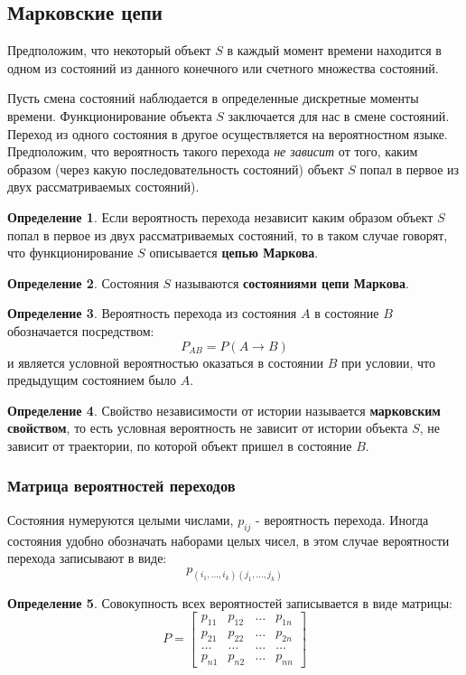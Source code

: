 \documentclass[aps,%
12pt,%
final,%
oneside,
onecolumn,%
musixtex, %
superscriptaddress,%
centertags]{article} %
\theoremstyle{plain}
\theoremstyle{definition}
\newtheorem{definition}{Определение}[subsection]
\theoremstyle{remark}
\begin{document}
\newpage
\subsection{Марковские цепи}

Предположим, что некоторый объект $S$ в каждый момент времени находится в одном из состояний из данного конечного или счетного множества состояний.

Пусть смена состояний наблюдается в определенные дискретные моменты времени. Функционирование объекта $S$ заключается для нас в смене состояний. Переход из одного состояния в другое осуществляется на вероятностном языке. Предположим, что вероятность такого перехода \textit{не зависит} от того, каким образом (через какую последовательность состояний) объект $S$ попал в первое из двух рассматриваемых состояний).

\begin{definition}
	Если вероятность перехода независит каким образом объект $S$ попал в первое из двух рассматриваемых состояний, то в таком случае говорят, что функционирование $S$ описывается \textbf{цепью Маркова}. 
\end{definition}
\begin{definition}
	Состояния $S$ называются \textbf{состояниями цепи Маркова}.
\end{definition}
\begin{definition}
	Вероятность перехода из состояния $A$ в состояние $B$ обозначается посредством:
	$$P_{AB} = P(A \to B)$$
	и является условной вероятностью оказаться в состоянии $B$ при условии, что предыдущим состоянием было $A$.
\end{definition}
\begin{definition}
	Свойство независимости от истории называется \textbf{марковским свойством}, то есть условная вероятность не зависит от истории объекта $S$, не зависит от траектории, по которой объект пришел в состояние $B$.
\end{definition}

\subsubsection{Матрица вероятностей переходов}

Состояния нумеруются целыми числами, $p_{ij}$ - вероятность перехода.  Иногда состояния удобно обозначать наборами целых чисел, в этом случае вероятности перехода записывают в виде:
$$p_{(i_1,\ldots,i_k)(j_1,\ldots,j_k)}$$

\begin{definition}
	Совокупность всех вероятностей записывается в виде матрицы:
	$$P = \begin{bmatrix}
		p_{11} & p_{12} & \ldots & p_{1n} \\
		p_{21} & p_{22} & \ldots & p_{2n} \\
		\ldots & \ldots & \ldots & \ldots \\
		p_{n1} & p_{n2} & \ldots & p_{nn}
	\end{bmatrix}$$
\end{definition}
\end{document}
